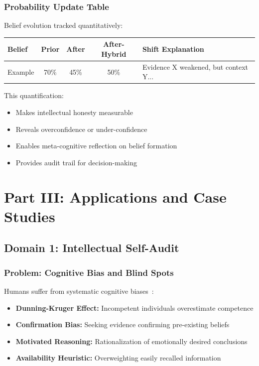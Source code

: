 \documentclass[11pt,a4paper]{article}
\theoremstyle{definition}
\theoremstyle{remark}
\begin{document}
\subsubsection{Probability Update Table}

Belief evolution tracked quantitatively:

\begin{center}
\begin{tabular}{|l|c|c|c|l|}
\hline
\textbf{Belief} & \textbf{Prior} & \textbf{After} & \textbf{After-Hybrid} & \textbf{Shift Explanation} \\
\hline
Example & 70\% & 45\% & 50\% & Evidence X weakened, but context Y... \\
\hline
\end{tabular}
\end{center}

This quantification:
\begin{itemize}
    \item Makes intellectual honesty measurable
    \item Reveals overconfidence or under-confidence
    \item Enables meta-cognitive reflection on belief formation
    \item Provides audit trail for decision-making
\end{itemize}

\section{Part III: Applications and Case Studies}

\subsection{Domain 1: Intellectual Self-Audit}

\subsubsection{Problem: Cognitive Bias and Blind Spots}

Humans suffer from systematic cognitive biases~\citep{kahneman2011thinking}:
\begin{itemize}
    \item \textbf{Dunning-Kruger Effect:} Incompetent individuals overestimate competence
    \item \textbf{Confirmation Bias:} Seeking evidence confirming pre-existing beliefs
    \item \textbf{Motivated Reasoning:} Rationalization of emotionally desired conclusions
    \item \textbf{Availability Heuristic:} Overweighting easily recalled information
\end{itemize}
\end{document}
